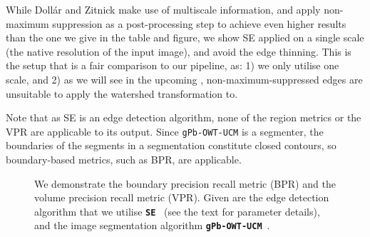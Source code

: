 While Doll{\'a}r and Zitnick \cite{DollarICCV13edges} make use of multiscale information, and apply non-maximum suppression as a post-processing step to achieve even higher results than the one we give in the table and figure, we show SE applied on a single scale (the native resolution of the input image), and avoid the edge thinning. This is the setup that is a fair comparison to our pipeline, as: 1) we only utilise one scale, and 2) as we will see in the upcoming , non-maximum-suppressed edges are unsuitable %
to apply the watershed transformation to.

Note that as SE is an edge detection algorithm, none of the region metrics or the VPR are applicable to its output. Since {\tt gPb-OWT-UCM} is a segmenter, the boundaries of the segments in a segmentation constitute closed contours, so boundary-based metrics, such as BPR, are applicable.

\begin{figure}[ht!]
\centering
\caption[{\tt SE} and {\tt gPb-OWT-UCM} comparison - plots]{We demonstrate the boundary precision recall metric (BPR) and the volume precision recall metric (VPR). Given are the edge detection algorithm that we utilise \textbf{\texttt{SE}}~\cite{DollarICCV13edges} (see the text for parameter details), and the image segmentation algorithm \textbf{\texttt{gPb-OWT-UCM}}~\cite{Arbelaez11}.}
\label{fig:SE_vs_gPb_OWT_UCM}
\end{figure}

